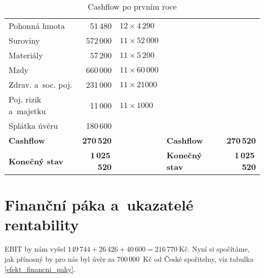 \begin{table}[htbp]
\begin{center}
\begin{tabular}{ l r l l r }
\hspace{0,5cm}Pohonná hmota                & 51\,480             & $12 \times 4\,290$  &                                                   &                    \\
\hspace{0,5cm}Suroviny                     & 572\,000            & $11 \times 52\,000$ &                                                   &                    \\
\hspace{0,5cm}Materiály                    & 57\,200             & $11 \times 5\,200$  &                                                   &                    \\
\hspace{0,5cm}Mzdy\index{mzda}                         & 660\,000            & $11 \times 60\,000$ &                                                   &                    \\
\hspace{0,5cm}Zdrav. a~soc. poj.           & 231\,000            & $11 \times 21000$ &                                                   &                    \\
\hspace{0,5cm}Poj. rizik a~majetku         & 11\,000             & $11 \times 1000$  & \textbf{}                                         & \textbf{}          \\
\hspace{0,5cm}Splátka úvěru\index{úvěr}                & 180\,600            &                   & \textbf{}                                         & \textbf{}          \\ \hline
\textbf{Cashflow\index{cashflow}}                          & \textbf{270\,520}   &                   & \textbf{Cashflow\index{cashflow}}                                 & \textbf{270\,520}   \\
\textbf{Konečný stav}                      & \textbf{1\,025\,520} &                   & \textbf{Konečný stav}                             & \textbf{1\,025\,520}
\end{tabular}
\caption{Cashflow po prvním roce}
\label{cashflow}
\end{center}
\end{table}


\section{Finanční páka a~ukazatelé rentability}
EBIT by nám vyšel $149\,744 + 26\,426 + 40\,600 = 216\,770~\text{Kč}$. Nyní si spočítáme, jak přínosný by pro nás byl úvěr za 700\,000~Kč od České spořitelny, viz tabulka \ref{efekt_financni_paky}.

